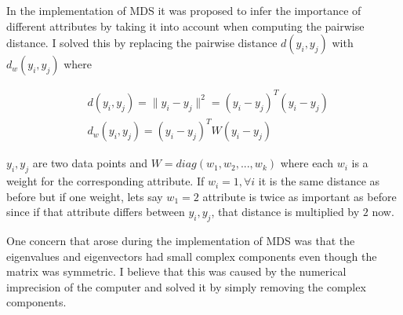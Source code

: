 In the implementation of MDS it was proposed to infer the importance of different attributes by taking it into account when computing the pairwise distance. I solved this by replacing the pairwise distance $d(y_i, y_j)$ with $d_w(y_i, y_j)$ where

\begin{align*}
  & d(y_i, y_j) = \|y_i -y_j \|^2 = (y_i-y_j)^T(y_i-y_j)\\
  & d_w(y_i, y_j) = (y_i-y_j)^T W (y_i-y_j)
\end{align*}

 $y_i, y_j$ are two data points and $W = diag(w_1,w_2,..., w_k)$ where each $w_i$ is a weight for the corresponding attribute. If $w_i = 1, \forall i$ it is the same distance as before but if one weight, lets say $w_1 = 2$ attribute is twice as important as before since if that attribute differs between $y_i, y_j$, that distance is multiplied by $2$ now.

One concern that arose during the implementation of MDS was that the eigenvalues and eigenvectors had small complex components even though the matrix was symmetric. I believe that this was caused by the numerical imprecision of the computer and solved it by simply removing the complex components.

